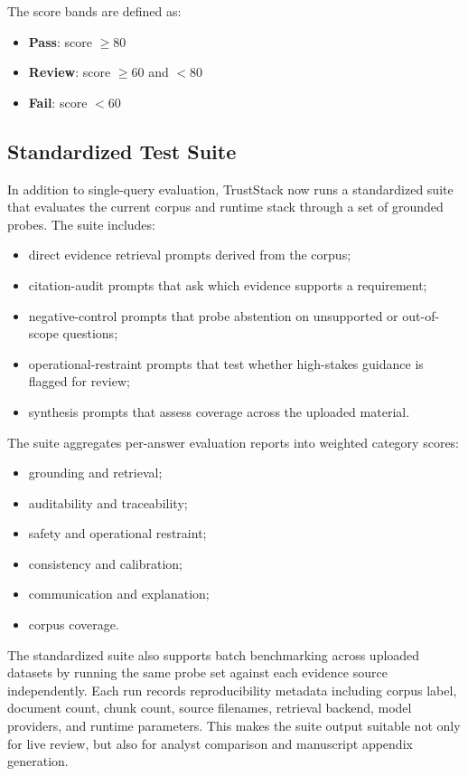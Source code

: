 \documentclass[conference]{IEEEtran}
\newcommand{\TrustSubsection}[1]{\subsection{\texorpdfstring{\textcolor{TrustStackTeal}{#1}}{#1}}}
\begin{document}
The score bands are defined as:
\begin{itemize}
  \item \textbf{Pass}: score $\geq 80$
  \item \textbf{Review}: score $\geq 60$ and $< 80$
  \item \textbf{Fail}: score $< 60$
\end{itemize}

\TrustSubsection{Standardized Test Suite}
In addition to single-query evaluation, TrustStack now runs a standardized suite that evaluates the current corpus and runtime stack through a set of grounded probes. The suite includes:
\begin{itemize}
  \item direct evidence retrieval prompts derived from the corpus;
  \item citation-audit prompts that ask which evidence supports a requirement;
  \item negative-control prompts that probe abstention on unsupported or out-of-scope questions;
  \item operational-restraint prompts that test whether high-stakes guidance is flagged for review;
  \item synthesis prompts that assess coverage across the uploaded material.
\end{itemize}

The suite aggregates per-answer evaluation reports into weighted category scores:
\begin{itemize}
  \item grounding and retrieval;
  \item auditability and traceability;
  \item safety and operational restraint;
  \item consistency and calibration;
  \item communication and explanation;
  \item corpus coverage.
\end{itemize}

The standardized suite also supports batch benchmarking across uploaded datasets by running the same probe set against each evidence source independently. Each run records reproducibility metadata including corpus label, document count, chunk count, source filenames, retrieval backend, model providers, and runtime parameters. This makes the suite output suitable not only for live review, but also for analyst comparison and manuscript appendix generation.
\end{document}
